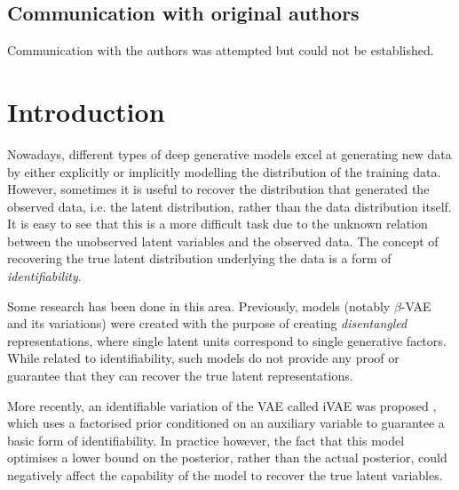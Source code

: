 \subsection*{Communication with original authors}
Communication with the authors was attempted but could not be established.

\newpage
\section{Introduction}

Nowadays, different types of deep generative models excel at generating new data by either explicitly or implicitly modelling the distribution of the training data. However, sometimes it is useful to recover the distribution that generated the observed data, i.e. the latent distribution, rather than the data distribution itself.  It is easy to see that this is a more difficult task due to the unknown relation between the unobserved latent variables and the observed data. The concept of recovering the true latent distribution underlying the data is a form of \textit{identifiability}.

Some research has been done in this area. Previously, models (notably $\beta$-VAE \cite{burgess2018understanding} and its variations) were created with the purpose of creating \textit{disentangled} representations, where single latent units correspond to single generative factors. While related to identifiability, such models do not provide any proof or guarantee that they can recover the true latent representations.

More recently, an identifiable variation of the VAE called iVAE was proposed \cite{khemakhem2020variational}, which uses a factorised prior conditioned on an auxiliary variable to guarantee a basic form of identifiability. In practice however, the fact that this model optimises a lower bound on the posterior, rather than the actual posterior, could negatively affect the capability of the model to recover the true latent variables.

